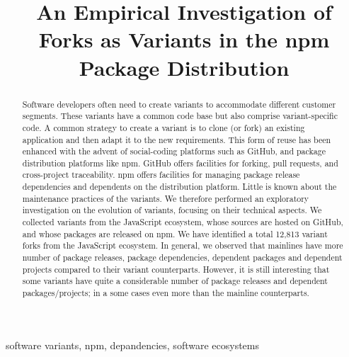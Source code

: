 \documentclass[conference]{IEEEtran}
\newcommand{\gh}{\textsf{GitHub}\xspace}
\newcommand{\np}{\textsf{npm}\xspace}
\newcommand{\js}{\textsf{JavaScript}\xspace}
\begin{document}
\title{An Empirical Investigation of Forks as Variants in the npm Package Distribution}


\author{
	}



\maketitle

\begin{abstract}
Software developers often need to create variants to accommodate different customer segments. These variants have a common code base but also comprise  variant-specific code. A common strategy to create a variant is to clone (or fork) an existing application and then adapt it to the new requirements. This form of reuse has been enhanced with the advent of social-coding platforms such as \gh, and package distribution platforms like \np. \gh offers facilities for forking, pull requests, and cross-project traceability. \np offers facilities for managing package release dependencies and dependents on the distribution platform. Little is known about the maintenance practices of the variants.
We therefore performed an exploratory investigation on the evolution of variants, focusing on their technical aspects. We collected variants from the \js ecosystem, whose sources are hosted on \gh, and whose packages are  released on npm. 
We have identified a total 12,813 variant forks from the \js ecosystem. In general, we observed that mainlines have more number of package releases, package dependencies, dependent packages and dependent projects compared to their variant counterparts. 
However, it is still interesting that some variants have quite a considerable number of package releases and dependent packages/projects; in a some cases even more than the mainline counterparts.
\end{abstract}

\begin{IEEEkeywords}
software variants, npm, depandencies, software ecosystems
\end{IEEEkeywords}













\end{document}
